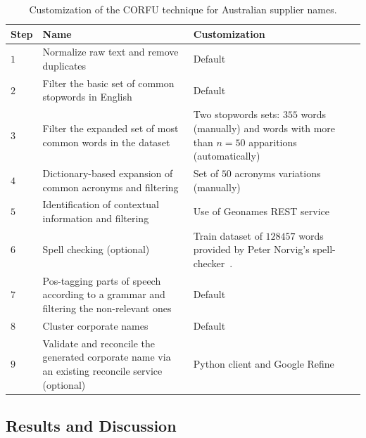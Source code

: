 \documentclass[1p,12pt]{elsarticle}
\begin{document}
\begin{table}[!htb]
	\renewcommand{\arraystretch}{1.3}
	\begin{center}
		\begin{tabular}{|p{1cm}|p{5.5cm}|p{5.5cm}|}
			\hline
			\textbf{Step} & \textbf{Name} & \textbf{Customization}  \\  \hline
			$1$ & Normalize raw text and remove duplicates & Default \\ \hline
			$2$ & Filter the basic set of common stopwords in English & Default\\ \hline
			$3$ & Filter the expanded set of most common words in the dataset & Two stopwords sets: $355$ words (manually) and words with more than $n=50 $ apparitions (automatically) \\ \hline
			$4$ & Dictionary-based expansion of common acronyms and filtering & Set of $50$ acronyms variations (manually) \\ \hline
			$5$ & Identification of contextual information and filtering & Use of Geonames REST service\\ \hline
			$6$ & Spell checking (optional) & Train dataset of $128457$ words provided by Peter Norvig's spell-checker~\citep{NorvigSpelling}. \\ \hline
			$7$ & Pos-tagging parts of speech according to a grammar and filtering the non-relevant ones & Default \\ \hline
			$8$ & Cluster corporate names & Default \\ \hline
			$9$ & Validate and reconcile the generated corporate name via an existing reconcile service (optional) & Python client and Google Refine \\ \hline
			\hline
		\end{tabular}
		\caption{Customization of the CORFU technique for Australian supplier names.}
		\label{config-corfu}
	\end{center}
\end{table} 




\subsection{Results and Discussion}
\end{document}
